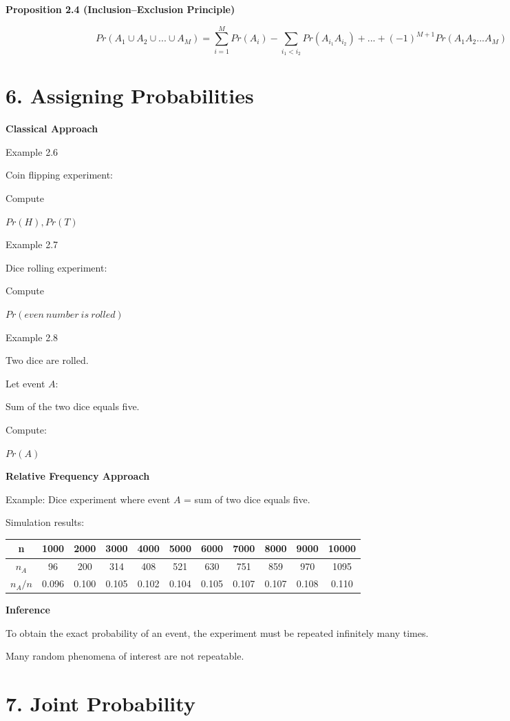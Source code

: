 \documentclass[12pt]{article}
\begin{document}
\textbf{Proposition 2.4 (Inclusion–Exclusion Principle)}

\[
Pr(A_1 \cup A_2 \cup ... \cup A_M)
=
\sum_{i=1}^{M} Pr(A_i)
-
\sum_{i_1<i_2} Pr(A_{i_1}A_{i_2})
+ ... +
(-1)^{M+1} Pr(A_1A_2...A_M)
\]

\section*{6. Assigning Probabilities}

\textbf{Classical Approach}

Example 2.6

Coin flipping experiment:

Compute

$Pr(H), Pr(T)$

Example 2.7

Dice rolling experiment:

Compute

$Pr(even\ number\ is\ rolled)$

Example 2.8

Two dice are rolled.

Let event $A$:

Sum of the two dice equals five.

Compute:

$Pr(A)$

\textbf{Relative Frequency Approach}

Example: Dice experiment where event $A$ = sum of two dice equals five.

Simulation results:

\begin{center}
\begin{tabular}{c|cccccccccc}
n & 1000 & 2000 & 3000 & 4000 & 5000 & 6000 & 7000 & 8000 & 9000 & 10000 \\
\hline
$n_A$ & 96 & 200 & 314 & 408 & 521 & 630 & 751 & 859 & 970 & 1095 \\
$n_A/n$ & 0.096 & 0.100 & 0.105 & 0.102 & 0.104 & 0.105 & 0.107 & 0.107 & 0.108 & 0.110
\end{tabular}
\end{center}

\textbf{Inference}

To obtain the exact probability of an event, the experiment must be repeated infinitely many times.

Many random phenomena of interest are not repeatable.

\section*{7. Joint Probability}
\end{document}
